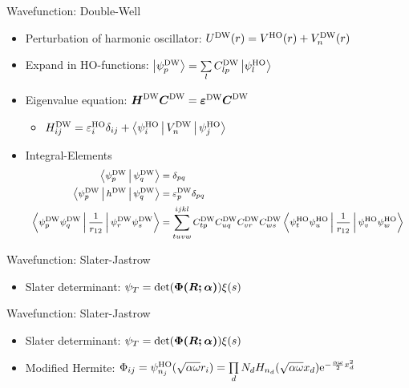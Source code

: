 \documentclass[10pt, t, xcolor=dvipsnames]{beamer}
\begin{document}
\begin{frame}[fragile]{Wavefunction: Double-Well}
    \begin{itemize}
        \item Perturbation of harmonic oscillator: $\UDW(r) = \VHO(r) + \VDW_n(r)$
        \item Expand in HO-functions: $\ket{\psiDW_p} = \sumll{l}C^{\text{DW}}_{lp}\ket{\psiHO_l}$
        \item Eigenvalue equation: $\blds{H}^{\text{DW}}\blds{C}^{\text{DW}} =
            \blds{\varepsilon^{\text{DW}}}\blds{C}^{\text{DW}}$
            \begin{itemize}
                \item $H^{\text{DW}}_{ij} = \veps^{\text{HO}}_i\delta_{ij} +
                    \Braket{\psiHO_i|\VDW_n|\psiHO_j}$
            \end{itemize}
        \item Integral-Elements
        \begin{equation*}
            \footnotesize
            \begin{aligned}
                \Braket{\psiDW_p|\psiDW_q} &= \delta_{pq} \\
                \Braket{\psiDW_p|h^{\text{DW}}|\psiDW_q} &=
                \varepsilon^{\text{DW}}_p\delta_{pq} \\
                \Braket{\psiDW_p\psiDW_q|\frac{1}{r_{12}}|\psiDW_r\psiDW_s} &=
                \suml{tuvw}{ijkl} C^{\text{DW}}_{tp}C^{\text{DW}}_{uq}C^{\text{DW}}_{vr}C^{\text{DW}}_{ws}
                \Braket{\psiHO_t\psiHO_u|\frac{1}{r_{12}}|\psiHO_v\psiHO_w}
            \end{aligned}
        \end{equation*}
    \end{itemize}
\end{frame}

\begin{frame}[fragile]{Wavefunction: Slater-Jastrow}
    \begin{itemize}
        \item Slater determinant: $\psi_T =
            \det(\blds{\Phi(\blds{R};\blds{\alpha})})
            \xi(s)$
    \end{itemize}
\end{frame}

\begin{frame}[fragile]{Wavefunction: Slater-Jastrow}
    \begin{itemize}
        \item Slater determinant: $\psi_T =
            \det(\blds{\Phi(\blds{R};\blds{\alpha})}) \xi(s)$
        \item Modified Hermite: $\Phi_{ij} =
            \psi^{\text{HO}}_{n_j}(\sqrt{\alpha\omega}r_i) = \prod\limits_d N_d
            H_{n_d}(\sqrt{\alpha \omega}x_d)\me^{-\frac{\alpha\omega}{2}x^2_d}$
    \end{itemize}
\end{frame}
\end{document}
